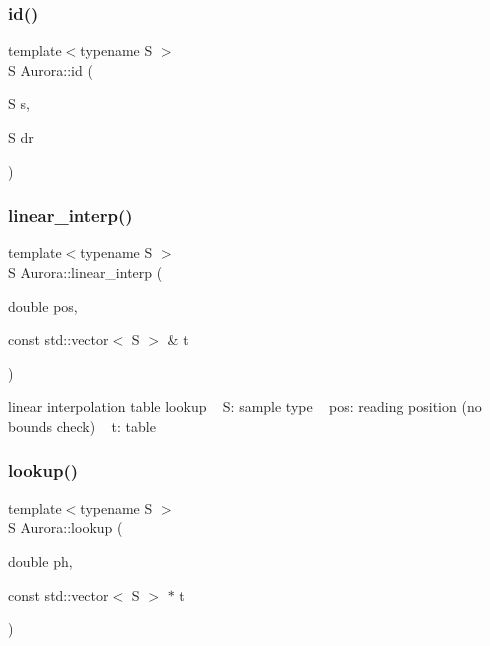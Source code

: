\subsubsection{\texorpdfstring{id()}{id()}}
{\footnotesize\ttfamily template$<$typename S $>$ \\
S Aurora\+::id (\begin{DoxyParamCaption}\item[{S}]{s,  }\item[{S}]{dr }\end{DoxyParamCaption})\hspace{0.3cm}{\ttfamily [inline]}}

\mbox{\label{namespace_aurora_acdc5f35b9cbf54f7fc84a423d76bd488}} 
\subsubsection{\texorpdfstring{linear\+\_\+interp()}{linear\_interp()}}
{\footnotesize\ttfamily template$<$typename S $>$ \\
S Aurora\+::linear\+\_\+interp (\begin{DoxyParamCaption}\item[{double}]{pos,  }\item[{const std\+::vector$<$ S $>$ \&}]{t }\end{DoxyParamCaption})\hspace{0.3cm}{\ttfamily [inline]}}

linear interpolation table lookup ~\newline
S\+: sample type ~\newline
pos\+: reading position (no bounds check) ~\newline
t\+: table \mbox{\label{namespace_aurora_ae0082f7bc3946a88145d54bacd0c6ff3}} 
\subsubsection{\texorpdfstring{lookup()}{lookup()}}
{\footnotesize\ttfamily template$<$typename S $>$ \\
S Aurora\+::lookup (\begin{DoxyParamCaption}\item[{double}]{ph,  }\item[{const std\+::vector$<$ S $>$ $\ast$}]{t }\end{DoxyParamCaption})\hspace{0.3cm}{\ttfamily [inline]}}

